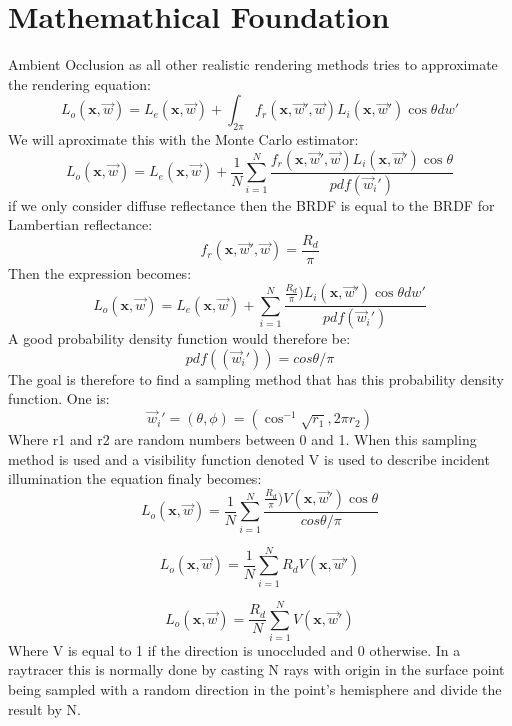 \section{Mathemathical Foundation}
Ambient Occlusion as all other realistic rendering methods tries to approximate the rendering equation:
\[ 
L_o(\textbf{x},\overrightarrow{w}) = 
L_e(\textbf{x},\overrightarrow{w}) +
\int_{2\pi}
 f_r(\textbf{x},\overrightarrow{w}',\overrightarrow{w} )L_i(\textbf{x},\overrightarrow{w}')\cos\theta dw'
\]
We will aproximate this with the Monte Carlo estimator\cite{Dutre2001}:
\[ 
L_o(\textbf{x},\overrightarrow{w}) = 
L_e(\textbf{x},\overrightarrow{w}) +
\frac{1}{N}
\sum_{i=1}^N \frac{ 
 f_r(\textbf{x},\overrightarrow{w}',\overrightarrow{w} )L_i(\textbf{x},\overrightarrow{w}')\cos\theta
}
{
pdf(\overrightarrow{w}_i')
}
\]
if we only consider diffuse reflectance then the BRDF is equal to the BRDF for Lambertian reflectance:
\[
 f_r(\textbf{x},\overrightarrow{w}',\overrightarrow{w}) = \frac{R_d}{\pi}
\]
Then the expression becomes:
\[ 
L_o(\textbf{x},\overrightarrow{w}) = 
L_e(\textbf{x},\overrightarrow{w}) +
\sum_{i=1}^N \frac{ 
\frac{R_d}{\pi})L_i(\textbf{x},\overrightarrow{w}')\cos\theta dw'
}
{
pdf(\overrightarrow{w}_i')
}
\]
A good probability density function would therefore be\cite{Dutre2001}:
\[
pdf((\overrightarrow{w}_i')) = cos\theta / \pi
\]
The goal is therefore to find a sampling method that has this probability density function. One is\cite{Dutre2001}:
\[
\overrightarrow{w}_i' = (\theta,\phi) =
(\cos^{-1}\sqrt{r_1},2\pi r_2)
\]
Where r1 and r2 are random numbers between 0 and 1.
When this sampling method is used and a visibility function denoted V is used to describe incident illumination the equation finaly becomes:
\[ 
L_o(\textbf{x},\overrightarrow{w}) = 
\frac{1}{N}
\sum_{i=1}^N \frac{ 
\frac{R_d}{\pi})V(\textbf{x},\overrightarrow{w}')\cos\theta
}
{
cos\theta / \pi
}
\]

\[ 
L_o(\textbf{x},\overrightarrow{w}) = 
\frac{1}{N}
\sum_{i=1}^N
R_d V(\textbf{x},\overrightarrow{w}')
\]

\[ 
L_o(\textbf{x},\overrightarrow{w}) = 
\frac{R_d}{N} \sum_{i=1}^N V(\textbf{x},\overrightarrow{w}')
\]
Where V is equal to 1 if the direction is unoccluded and 0 otherwise. In a raytracer this is normally done by casting N rays with origin in the surface point being sampled with a random direction in the point's hemisphere and divide the result by N.
